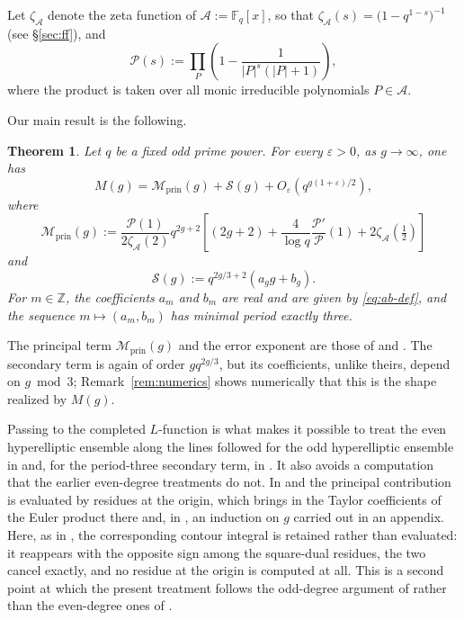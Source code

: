 \documentclass[a4paper,reqno]{amsart}
\numberwithin{equation}{section}
\newtheorem{theorem}{Theorem}[section]
\theoremstyle{remark}
\theoremstyle{definition}
\newcommand{\A}{\mathcal{A}}
\newcommand{\zA}{\zeta_{\A}}
\begin{document}
Let $\zA$ denote the zeta function of $\A:=\mathbb F_q[x]$, so that
$\zA(s)=\bigl(1-q^{1-s}\bigr)^{-1}$ (see \S\ref{sec:ff}), and
$$
\mathscr P(s)
:=
\prod_P
\left(
1-\frac{1}{|P|^s(|P|+1)}
\right),
$$
where the product is taken over all monic irreducible polynomials $P\in\A$.

Our main result is the following.

\begin{theorem}\label{thm:main}
Let $q$ be a fixed odd prime power. For every $\varepsilon>0$, as
$g\to\infty$, one has
\begin{equation}\label{eq:main}
M(g)
=
\mathcal M_{\mathrm{prin}}(g)
+
\mathcal S(g)
+
O_\varepsilon\!\left(q^{g(1+\varepsilon)/2}\right),
\end{equation}
where
\begin{equation}\label{eq:Mprin-intro}
\mathcal M_{\mathrm{prin}}(g)
:=
\frac{\mathscr P(1)}{2\zA(2)}
q^{2g+2}
\left[
(2g+2)
+
\frac{4}{\log q}
\frac{\mathscr P'}{\mathscr P}(1)
+
2\zA\!\left(\tfrac12\right)
\right]
\end{equation}
and
\begin{equation}\label{eq:S-intro}
\mathcal S(g)
:=
q^{2g/3+2}
\left(
a_gg+b_g
\right).
\end{equation}
For $m\in\mathbb Z$, the coefficients $a_m$ and $b_m$ are real and are given
by \eqref{eq:ab-def}, and the sequence
$m\mapsto(a_m,b_m)$ has minimal period exactly three.
\end{theorem}

The principal term $\mathcal M_{\mathrm{prin}}(g)$ and the error exponent are
those of \cite[Theorem~1.4]{AM-21} and \cite[Theorem~1.1]{Ju20}. 
The secondary term is again of order $gq^{2g/3}$, but its coefficients, unlike
theirs, depend on $g\bmod3$; Remark~\ref{rem:numerics} shows numerically that
this is the shape realized by $M(g)$.

Passing to the completed $L$-function is what makes it possible to treat the
even hyperelliptic ensemble along the lines followed for the odd hyperelliptic
ensemble in \cite{Fl17-1} and, for the period-three secondary term, in
\cite{Ju26}. It also avoids a computation that the earlier even-degree
treatments do not. In \cite{AM-21} and \cite{Ju20} the principal contribution
is evaluated by
residues at the origin, which brings in the Taylor coefficients of the Euler
product there and, in \cite{AM-21}, an induction on $g$ carried out in an
appendix. Here, as in \cite[Section~8]{Fl17-1}, the corresponding contour
integral is retained rather than evaluated: it reappears with the opposite
sign among the square-dual residues, the two cancel exactly, and no residue
at the origin is computed at all. 
This is a second point at which the present treatment follows the odd-degree
argument of \cite{Fl17-1} rather than the even-degree ones of \cite{AM-21, Ju20}.
\end{document}
